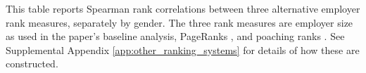 %
\begin{table}[htbp!]
    \caption{Rank correlations between alternative employer rank measures, by gender}
    \label{tab:ranks}
    \resizebox{\textwidth}{!}{%
    
    }
    \begin{tablenotes}
        \footnotesize
        This table reports Spearman rank correlations between three alternative employer rank measures, separately by gender. The three rank measures are employer size as used in the paper's baseline analysis, PageRanks \citep{PageBrinMotwaniWinograd1999, Sorkin2018}, and poaching ranks \citep{BaggerLentz2019}. See Supplemental Appendix \ref{app:other_ranking_systems} for details of how these are constructed. %
    \end{tablenotes}
    \begin{tablenotes}[Source]
        {\sourcedata}%
    \end{tablenotes}
\end{table}
%

